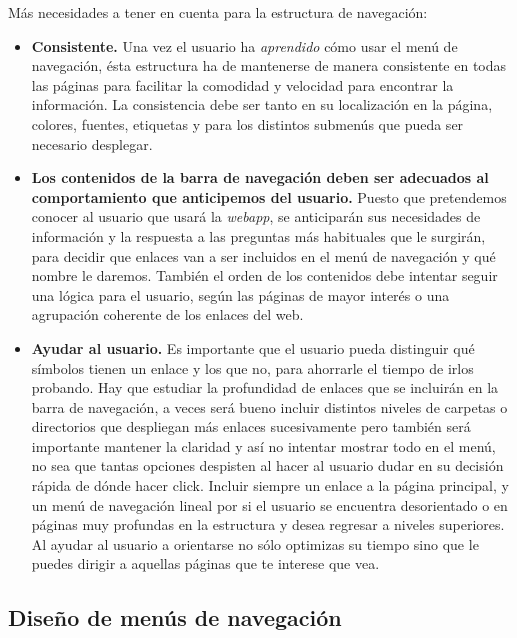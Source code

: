 		
		Más necesidades a tener en cuenta para la estructura de navegación:
		
		\begin{itemize}
			\item \textbf{Consistente.} Una vez el usuario ha \textit{aprendido} cómo usar el menú de navegación, ésta estructura ha de mantenerse de manera consistente en todas las páginas para facilitar la comodidad y velocidad para encontrar la información.
			La consistencia debe ser tanto en su localización en la página, colores, fuentes, etiquetas y para los distintos submenús que pueda ser necesario desplegar.
			\item  \textbf{Los contenidos de la barra de navegación deben ser adecuados al comportamiento que anticipemos del usuario.}	Puesto que pretendemos conocer al usuario que usará la \textit{webapp}, se anticiparán sus necesidades de información y la respuesta a las preguntas más habituales que le surgirán, para decidir que enlaces van a ser incluidos en el menú de navegación y qué nombre le daremos.
			También el orden de los contenidos debe intentar seguir una lógica para el usuario, según las páginas de mayor interés o una agrupación coherente de los enlaces del web.
			\item \textbf{Ayudar al usuario.} Es importante que el usuario pueda distinguir qué símbolos tienen un enlace y los que no, para ahorrarle el tiempo de irlos probando.
			Hay que estudiar la profundidad de enlaces que se incluirán en la barra de navegación, a veces será bueno incluir distintos niveles de carpetas o directorios que despliegan más enlaces sucesivamente pero también será importante mantener la claridad y así no intentar mostrar todo en el menú, no sea que tantas opciones despisten al hacer al usuario dudar en su decisión rápida de dónde hacer click. Incluir siempre un enlace a la página principal, y un menú de navegación lineal por si el usuario se encuentra desorientado o en páginas muy profundas en la estructura y desea regresar a niveles superiores.
			Al ayudar al usuario a orientarse no sólo optimizas su tiempo sino que le puedes dirigir a aquellas páginas que te interese que vea.
		\end{itemize}
		
	
	
	\subsection{Diseño de menús de navegación} %
	\label{sub:nav_diseno_de_menus_de_navegacion}


